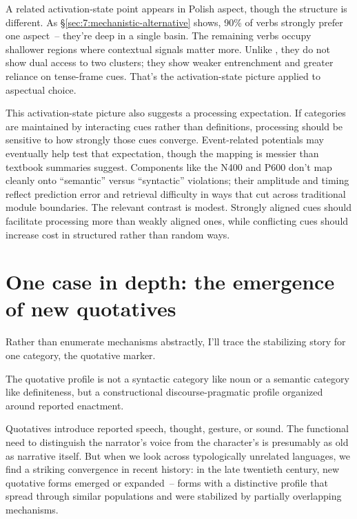 A related activation-state point appears in Polish aspect, though the structure is different. As §\ref{sec:7:mechanistic-alternative} shows, 90\% of verbs strongly prefer one aspect~-- they're deep in a single basin. The remaining verbs occupy shallower regions where contextual signals matter more. Unlike , they do not show dual access to two clusters; they show weaker entrenchment and greater reliance on tense-frame cues. That's the activation-state picture applied to aspectual choice.

This activation-state picture also suggests a processing expectation. If categories are maintained by interacting cues rather than definitions, processing should be sensitive to how strongly those cues converge. Event-related potentials may eventually help test that expectation, though the mapping is messier than textbook summaries suggest. Components like the N400 and P600 don't map cleanly onto \enquote{semantic} versus \enquote{syntactic} violations; their amplitude and timing reflect prediction error and retrieval difficulty in ways that cut across traditional module boundaries. The relevant contrast is modest. Strongly aligned cues should facilitate processing more than weakly aligned ones, while conflicting cues should increase cost in structured rather than random ways.



\section{One case in depth: the emergence of new quotatives}
\label{sec:6:one-case}

Rather than enumerate mechanisms abstractly, I'll trace the stabilizing story for one category, the quotative marker.

The quotative profile is not a syntactic category like noun or a semantic category like definiteness, but a constructional discourse-pragmatic profile organized around reported enactment.

Quotatives introduce reported speech, thought, gesture, or sound. The functional need to distinguish the narrator's voice from the character's is presumably as old as narrative itself. But when we look across typologically unrelated languages, we find a striking convergence in recent history: in the late twentieth century, new quotative forms emerged or expanded~-- forms with a distinctive profile that spread through similar populations and were stabilized by partially overlapping mechanisms.

